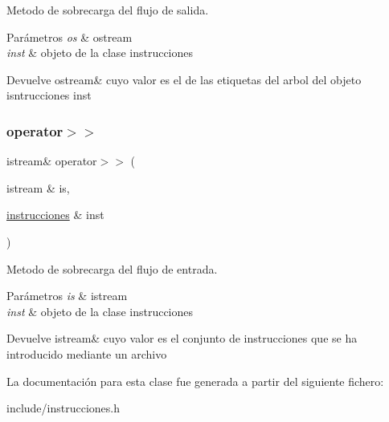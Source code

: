 Metodo de sobrecarga del flujo de salida. 


\begin{DoxyParams}{Parámetros}
{\em os} & ostream \\
\hline
{\em inst} & objeto de la clase instrucciones \\
\hline
\end{DoxyParams}
\begin{DoxyReturn}{Devuelve}
ostream\& cuyo valor es el de las etiquetas del arbol del objeto isntrucciones inst 
\end{DoxyReturn}
\mbox{\label{classinstrucciones_a0f29981464115f829915ff9f43275477}} 
\subsubsection{\texorpdfstring{operator$>$$>$}{operator>>}}
{\footnotesize\ttfamily istream\& operator$>$$>$ (\begin{DoxyParamCaption}\item[{istream \&}]{is,  }\item[{\hyperlink{classinstrucciones}{instrucciones} \&}]{inst }\end{DoxyParamCaption})\hspace{0.3cm}{\ttfamily [friend]}}



Metodo de sobrecarga del flujo de entrada. 


\begin{DoxyParams}{Parámetros}
{\em is} & istream \\
\hline
{\em inst} & objeto de la clase instrucciones \\
\hline
\end{DoxyParams}
\begin{DoxyReturn}{Devuelve}
istream\& cuyo valor es el conjunto de instrucciones que se ha introducido mediante un archivo 
\end{DoxyReturn}


La documentación para esta clase fue generada a partir del siguiente fichero\+:\begin{DoxyCompactItemize}
\item 
include/instrucciones.\+h\end{DoxyCompactItemize}
